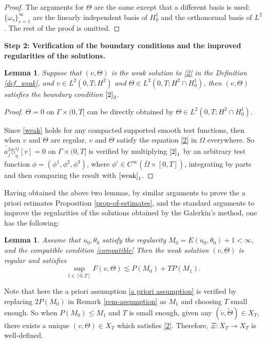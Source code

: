 \documentclass[12pt,a4paper]{amsart}
\numberwithin{equation}{section}
\theoremstyle{plain}
\newtheorem{Lem}[Thm]{Lemma}
\theoremstyle{definition}
\begin{document}
\begin{proof}
    
    The arguments for $\Theta$ are the same except that a different basis is used: $\{\omega_s \}_{s=1}^{\infty}$ are the linearly independent basis of $H^1_0$ and the orthonormal basis of $L^2$. 
    The rest of the proof is omitted.
\end{proof}


\vspace{0.3cm}
\textbf{Step 2: Verification of the boundary conditions and the improved regularities of the solutions.} 

\begin{Lem}
	Suppose that $(v,\Theta)$ is the weak solution to \eqref{2} in the Definition \ref{def_weak}, and  $v\in L^2(0,T;H^2)$ and $\Theta \in L^2(0,T;H^2\cap H^1_0)$,
	then $(v,\Theta)$ satisfies the boundary condition $\eqref{2}_3$.
\end{Lem}
\begin{proof}
	$\Theta=0$ on $\Gamma\times (0,T]$ can be directly obtained by $\Theta \in L^2(0,T;H^2\cap H^1_0)$.
	
    Since \eqref{weak} holds for any compacted supported smooth test functions,
	then when $v$ and $\Theta$ are regular, $v$ and $\Theta$ satisfy the equation \eqref{2} in $\Omega$ everywhere.
	So $\widetilde{a_j^3} \mathbb{S}_{\widetilde{\eta}}^{ij}[v]=0$ on $\Gamma\times (0,T]$ is verified by multiplying $\eqref{2}_1$ by an arbitrary test function $\phi=(\phi^1, \phi^2, \phi^3)$, where  $\phi^i\in C^{\infty}(\overline{\Omega}\times[0,T])$, integrating by parts and then comparing the result with $\eqref{weak}_1$.
\end{proof}

Having obtained the above two lemmas, by similar arguments to prove the a priori estimates Proposition \ref{prop-of-estimates}, and the standard arguments to improve the regularities of the solutions obtained by the Galerkin's method, 
one has the following:

\begin{Lem}
	Assume that $u_0, \theta_0$ satisfy the regularity $M_0=E(u_0, \theta_0)+1<\infty$, and the  compatible condition \eqref{compatible}
	Then the weak solution $(v,\Theta)$ is regular and satisfies
	\begin{equation*}
	\sup\limits_{t\in[0,T]}F(v,\Theta)\lesssim  P(M_0)+TP(M_1).
	\end{equation*}
\end{Lem}

Note that here the a priori assumption \eqref{a priori assumption} is verified by replacing $2P(M_0)$ in Remark \ref{rem-assumption} as $M_1$ and choosing $T$ small enough.
So when $P(M_0)\leq M_1$ and $T$ is small enough, given any $(\widetilde{v},\widetilde{\Theta})\in X_T$, there exists a unique $(v,\Theta)\in X_T$ which satisfies \eqref{2}. 
Therefore, $\Xi: X_T\rightarrow X_T$ is well-defined.
\end{document}
